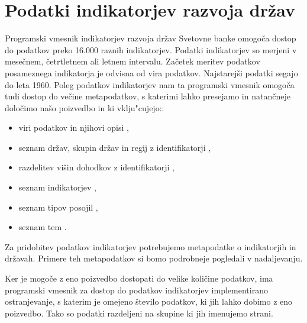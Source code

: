 \section{Podatki indikatorjev razvoja držav}
\label{sec:podatki_ind_razvoja}



Programski vmesnik indikatorjev razvoja držav Svetovne banke omogoča dostop
do podatkov preko 16.000 raznih indikatorjev. Podatki indikatorjev so merjeni v
mesečnem, četrtletnem ali letnem intervalu. Začetek meritev podatkov
posameznega indikatorja je odvisna od vira podatkov. Najstarejši podatki segajo
do leta 1960. Poleg podatkov indikatorjev nam ta programski vmesnik omogoča 
tudi dostop do večine metapodatkov, s katerimi lahko presejamo in natančneje
določimo našo poizvedbo in ki vklju"cujejo::
\begin{itemize}
\item viri podatkov in njihovi opisi 
  ,
\item seznam držav, skupin držav in regij z identifikatorji 
  ,
\item razdelitev višin dohodkov z identifikatorji 
  ,
\item seznam indikatorjev 
  ,
\item seznam tipov posojil 
  ,
\item seznam tem 
  .
\end{itemize}

Za pridobitev podatkov indikatorjev potrebujemo metapodatke o indikatorjih in
državah. Primere teh metapodatkov si bomo podrobneje pogledali v nadaljevanju.

Ker je mogoče z eno poizvedbo dostopati do velike količine podatkov, ima
programski vmesnik za dostop do podatkov indikatorjev implementirano
ostranjevanje, s katerim je omejeno število podatkov, ki jih lahko dobimo z eno
poizvedbo. Tako so podatki razdeljeni na skupine ki jih imenujemo strani.

